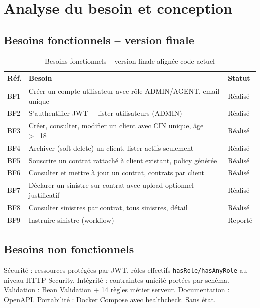 \documentclass[a4paper,12pt]{article}
\begin{document}
\section{Analyse du besoin et conception}
\subsection{Besoins fonctionnels -- version finale}
\begin{table}[htbp]
\centering
\caption{Besoins fonctionnels -- version finale alignée code actuel}
\label{tab:bf}
\small
\begin{tabularx}{\linewidth}{@{}C{1.2cm} X L{2.6cm}@{}}
\toprule
\textbf{Réf.} & \textbf{Besoin} & \textbf{Statut} \\
\midrule
BF1 & Créer un compte utilisateur avec rôle ADMIN/AGENT, email unique & Réalisé \\
BF2 & S'authentifier JWT + lister utilisateurs (ADMIN) & Réalisé \\
BF3 & Créer, consulter, modifier un client avec CIN unique, âge >=18 & Réalisé \\
BF4 & Archiver (soft-delete) un client, lister actifs seulement & Réalisé \\
BF5 & Souscrire un contrat rattaché à client existant, policy générée & Réalisé \\
BF6 & Consulter et mettre à jour un contrat, contrats par client & Réalisé \\
BF7 & Déclarer un sinistre sur contrat avec upload optionnel justificatif & Réalisé \\
BF8 & Consulter sinistres par contrat, tous sinistres, détail & Réalisé \\
BF9 & Instruire sinistre (workflow) & Reporté \\
\bottomrule
\end{tabularx}
\end{table}

\subsection{Besoins non fonctionnels}
Sécurité : ressources protégées par JWT, rôles effectifs \texttt{hasRole/hasAnyRole} au niveau HTTP Security. Intégrité : contraintes unicité portées par schéma. Validation : Bean Validation + 14 règles métier serveur. Documentation : OpenAPI. Portabilité : Docker Compose avec healthcheck. Sans état.
\end{document}

